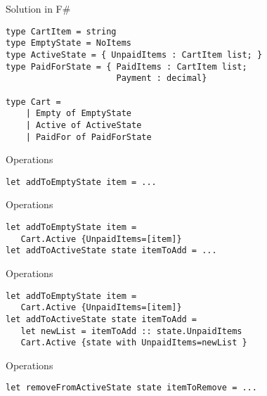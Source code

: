 \documentclass{beamer}
\begin{document}
\begin{frame}[fragile]{Solution in F\#}
  \begin{center}  \end{center}
  \begin{verbatim}
type CartItem = string
type EmptyState = NoItems
type ActiveState = { UnpaidItems : CartItem list; }
type PaidForState = { PaidItems : CartItem list;
                      Payment : decimal}

type Cart =
    | Empty of EmptyState
    | Active of ActiveState
    | PaidFor of PaidForState
  \end{verbatim}
\end{frame}

\begin{frame}[fragile]{Operations}
  \begin{center}  \end{center}
  \begin{verbatim}
let addToEmptyState item = ...
  \end{verbatim}
\end{frame}

\begin{frame}[fragile]{Operations}
  \begin{center}  \end{center}
  \begin{verbatim}
let addToEmptyState item =
   Cart.Active {UnpaidItems=[item]}
let addToActiveState state itemToAdd = ...
  \end{verbatim}
\end{frame}

\begin{frame}[fragile]{Operations}
  \begin{center}  \end{center}
  \begin{verbatim}
let addToEmptyState item =
   Cart.Active {UnpaidItems=[item]}
let addToActiveState state itemToAdd =
   let newList = itemToAdd :: state.UnpaidItems
   Cart.Active {state with UnpaidItems=newList }
  \end{verbatim}
\end{frame}

\begin{frame}[fragile]{Operations}
  \begin{center}  \end{center}
  \begin{verbatim}
let removeFromActiveState state itemToRemove = ...
  \end{verbatim}
\end{frame}
\end{document}
